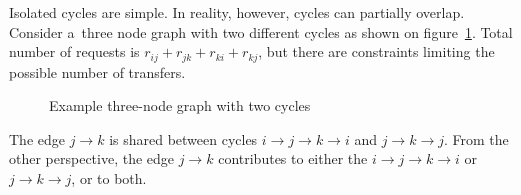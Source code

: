 \documentclass[paper=a4,parskip=half,DIV=12]{leetcode}
\begin{document}
Isolated cycles are simple. In reality, however, cycles can partially overlap.
Consider a~three node graph with two different cycles as shown on
figure~\ref{fig:XDUOL}. Total number of requests is $r_{ij} + r_{jk} + r_{ki} +
r_{kj}$, but there are constraints limiting the possible number of transfers.
\begin{figure}[htbp]
  \centering
  \caption{Example three-node graph with two cycles}
  \label{fig:XDUOL}
\end{figure}
The edge $j \to k$ is shared between cycles $i \to j \to k \to i$ and $j \to k
\to j$. From the other perspective, the edge $j \to k$ contributes to either
the $i \to j \to k \to i$ or $j \to k \to j$, or to both.



\end{document}
